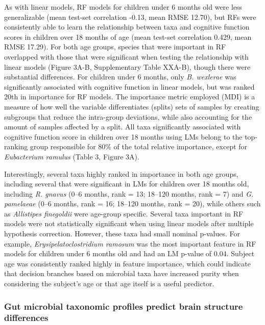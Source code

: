 \documentclass[a4paper]{article}
\begin{document}
As with linear models, RF models for children under 6 months old were
less generalizable (mean test-set correlation -0.13, mean RMSE 12.70),
but RFs were consistently able to learn the relationship between taxa
and cognitive function scores in children over 18 months of age (mean
test-set correlation 0.429, mean RMSE 17.29). For both age groups,
species that were important in RF overlapped with those that were
significant when testing the relationship with linear models (Figure
3A-B, Supplementary Table XXA-B), though there were substantial
differences. For children under 6 months, only \emph{B. wexlerae} was
significantly associated with cognitive function in linear models, but
was ranked 20th in importance for RF models. The importance metric
employed (MDI) is a measure of how well the variable differentiates
(splits) sets of samples by creating subgroups that reduce the
intra-group deviations, while also accounting for the amount of samples
affected by a split. All taxa significantly associated with cognitive
function score in children over 18 months using LMs belong to the
top-ranking group responsible for 80\% of the total relative importance,
except for \emph{Eubacterium ramulus} (Table 3, Figure 3A).

Interestingly, several taxa highly ranked in importance in both age
groups, including several that were significant in LMs for children over
18 months old, including \emph{R. gnavus} (0--6 months, rank = 13;
18--120 months, rank = 7) and \emph{G. pamelaeae} (0--6 months, rank =
16; 18--120 months, rank = 20), while others such as \emph{Allistipes
finegoldii} were age-group specific. Several taxa important in RF models
were not statistically significant when using linear models after
multiple hypothesis correction. However, these taxa had small nominal
p-values. For example, \emph{Erysipelatoclostridium ramosum} was the
most important feature in RF models for children under 6 months old and
had an LM p-value of 0.04. Subject age was consistently ranked highly in
feature importance, which could indicate that decision branches based on
microbial taxa have increased purity when considering the subject's age
or that age itself is a useful predictor.

\subsubsection{Gut microbial taxonomic profiles predict brain structure differences}
\end{document}
